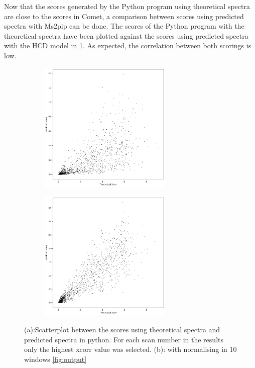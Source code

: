\documentclass[11pt]{article}
\begin{document}
Now that the scores generated by the Python program using theoretical spectra are close to the scores in Comet, a comparison between scores using predicted spectra with Ms2pip can be done. The scores of the Python program with the theoretical spectra have been plotted against the scores using predicted spectra with the HCD model in \cref{fig:scatterplot_predicted_theoretical}. As expected, the correlation between both scorings is low. 

\begin{figure}
\centering
\begin{subfigure}[b]{1\textwidth}
    \includegraphics[width=0.7\textwidth]{figs/scatterplot_predicted_theoretical.png}
   \caption{}
   \label{fig:scatterplot_predicted_theoretical} 
\end{subfigure}
\begin{subfigure}[b]{1\textwidth}
   \includegraphics[width=0.7\textwidth]{figs/scatterplot_windows.png}
   \caption{}
   \label{fig:scatterplot_windows}
\end{subfigure}
\caption{(a):Scatterplot between the scores using theoretical spectra and predicted spectra in python. For each scan number in the results only the highest xcorr value was selected. (b): with normalising in 10 windows \cref{fig:output}}
\label{scatterplot_python}
\end{figure}
\end{document}
